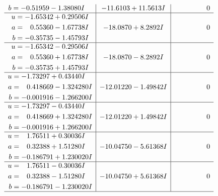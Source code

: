 \documentclass[1p]{elsarticle_modified}
\theoremstyle{definition}
\begin{document}
$$\begin{array}{c|c|c}
\begin{aligned}
b &= -0.51959 - 1.38080 I\end{aligned}
 & -11.6103 + 11.5613 I & \phantom{-0.000000 } 0 \\ \hline\begin{aligned}
u &= -1.65342 + 0.29506 I \\
a &= \phantom{-}0.55360 - 1.67738 I \\
b &= -0.35735 - 1.45793 I\end{aligned}
 & -18.0870 + 8.2892 I & \phantom{-0.000000 } 0 \\ \hline\begin{aligned}
u &= -1.65342 - 0.29506 I \\
a &= \phantom{-}0.55360 + 1.67738 I \\
b &= -0.35735 + 1.45793 I\end{aligned}
 & -18.0870 - 8.2892 I & \phantom{-0.000000 } 0 \\ \hline\begin{aligned}
u &= -1.73297 + 0.43440 I \\
a &= \phantom{-}0.418669 - 1.324280 I \\
b &= -0.001916 - 1.266200 I\end{aligned}
 & -12.01220 - 1.49842 I & \phantom{-0.000000 } 0 \\ \hline\begin{aligned}
u &= -1.73297 - 0.43440 I \\
a &= \phantom{-}0.418669 + 1.324280 I \\
b &= -0.001916 + 1.266200 I\end{aligned}
 & -12.01220 + 1.49842 I & \phantom{-0.000000 } 0 \\ \hline\begin{aligned}
u &= \phantom{-}1.76511 + 0.30036 I \\
a &= \phantom{-}0.32388 + 1.51280 I \\
b &= -0.186791 + 1.230020 I\end{aligned}
 & -10.04750 - 5.61368 I & \phantom{-0.000000 } 0 \\ \hline\begin{aligned}
u &= \phantom{-}1.76511 - 0.30036 I \\
a &= \phantom{-}0.32388 - 1.51280 I \\
b &= -0.186791 - 1.230020 I\end{aligned}
 & -10.04750 + 5.61368 I & \phantom{-0.000000 } 0\\
 \hline 
 \end{array}$$\newpage\newpage\renewcommand{\arraystretch}{1}
\end{document}
